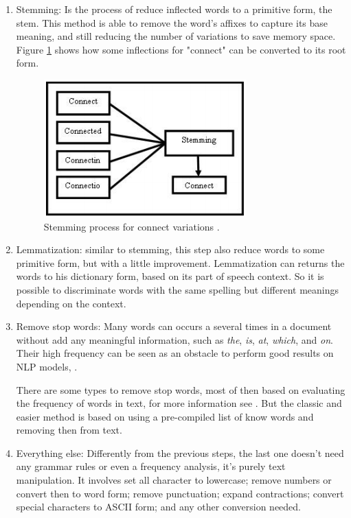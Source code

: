 \begin{enumerate}
	\item Stemming: Is the process of reduce inflected words to a primitive form, the stem. This method is able to remove the word's affixes to capture its base meaning, and still reducing the number of variations to save memory space. Figure \ref{fig:stemming} shows how some inflections for "connect" can be converted to its root form.
		
	\begin{figure}[h!]
		\centering
		\includegraphics[width=0.45\linewidth]{01.Chapters/03.NLP/stemming}
		\caption{Stemming process for connect variations \cite{vijayarani2015preprocessing}.}
		\label{fig:stemming}
	\end{figure}
	
	
	\item Lemmatization: similar to stemming, this step also reduce words to some primitive form, but with a little improvement. Lemmatization can returns the words to his dictionary form, based on its part of speech context. So it is possible to discriminate words with the same spelling but different meanings depending on the context. 	
	
	\item Remove stop words:
	Many words can occurs a several times in a document without add any meaningful information, such as \textit{the}, \textit{is}, \textit{at}, \textit{which}, and \textit{on}. Their high frequency can be seen as an obstacle to perform good results on NLP models, \cite{kannan2014preprocessing}. 

	There are some types to remove stop words, most of then based on evaluating the frequency of words in text, for more information see \cite{x}. But the classic and easier method is based on using a pre-compiled list of know words and removing then from text.
	
	\item Everything else:
	Differently from the previous steps, the last one doesn't need any grammar rules or even a frequency analysis, it's purely text manipulation. It involves set all character to lowercase; remove numbers or convert then to word form; remove punctuation; expand contractions; convert special characters to ASCII form; and any other conversion needed.		 	
\end{enumerate}

